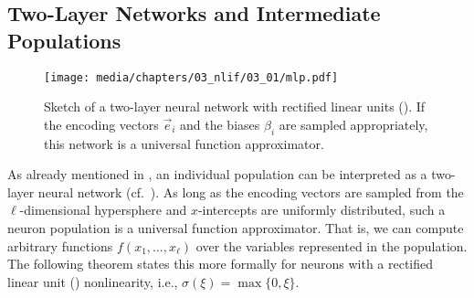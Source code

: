 
\subsection{Two-Layer Networks and Intermediate Populations}
\label{sec:two_layer_intermediate}

\begin{figure}
	\texttt{[image: media/chapters/03\_nlif/03\_01/mlp.pdf]}
	\caption[Sketch of a two-layer neural network]{Sketch of a two-layer neural network with rectified linear units (\ReLUpl). If the encoding vectors $\vec e_i$ and the biases $\beta_i$ are sampled appropriately, this network is a universal function approximator.}
	\label{fig:mlp}
\end{figure}

As already mentioned in , an individual \NEF population can be interpreted as a two-layer neural network (cf.~).
As long as the encoding vectors are sampled from the $\ell$-dimensional hypersphere and $x$-intercepts are uniformly distributed, such a neuron population is a universal function approximator.
That is, we can compute arbitrary functions $f(x_1, \ldots, x_\ell)$ over the variables represented in the population.
The following theorem states this more formally for neurons with a rectified linear unit (\ReLU) nonlinearity, i.e., $\sigma(\xi) = \max\{0, \xi\}$.

